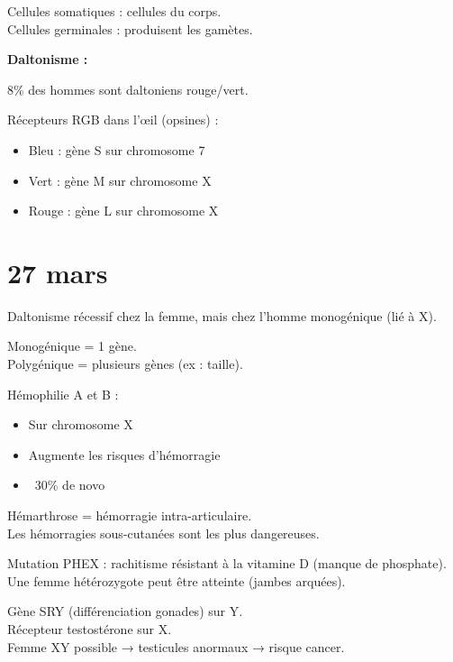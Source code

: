 \documentclass[11pt]{article}
\begin{document}
\vspace{0.3cm}

Cellules somatiques : cellules du corps.\\
Cellules germinales : produisent les gamètes.

\vspace{0.3cm}

\textbf{Daltonisme :}

8\% des hommes sont daltoniens rouge/vert.

Récepteurs RGB dans l'œil (opsines) :
\begin{itemize}
    \item Bleu : gène S sur chromosome 7
    \item Vert : gène M sur chromosome X
    \item Rouge : gène L sur chromosome X
\end{itemize}

\section*{27 mars}

Daltonisme récessif chez la femme, mais chez l'homme monogénique (lié à X).

Monogénique = 1 gène.\\
Polygénique = plusieurs gènes (ex : taille).

\vspace{0.3cm}

Hémophilie A et B :
\begin{itemize}
    \item Sur chromosome X
    \item Augmente les risques d'hémorragie
    \item ~30\% de novo
\end{itemize}

Hémarthrose = hémorragie intra-articulaire.\\
Les hémorragies sous-cutanées sont les plus dangereuses.

\vspace{0.3cm}

Mutation PHEX :
rachitisme résistant à la vitamine D (manque de phosphate).\\
Une femme hétérozygote peut être atteinte (jambes arquées).

\vspace{0.3cm}

Gène SRY (différenciation gonades) sur Y.\\
Récepteur testostérone sur X.\\
Femme XY possible → testicules anormaux → risque cancer.
\end{document}
